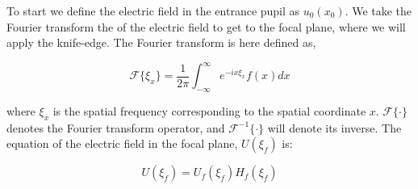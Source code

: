  




To start we define the electric field in the entrance pupil as $u_0(x_0)$. We take the Fourier transform the of the electric field to get to the focal plane, where we will apply the knife-edge. The Fourier transform is here defined as,

\begin{equation}
    \mathcal{F}\{\xi_x\}=\frac{1}{2\pi}\int_{-\infty}^\infty e^{-i x \xi_x} f(x) dx
    \label{FourierT}
\end{equation}

\noindent where $\xi_x$ is the spatial frequency corresponding to the spatial coordinate $x$. $\mathcal{F}\{\cdot\}$ denotes the Fourier transform operator, and  $\mathcal{F}^{-1}\{\cdot\}$ will denote its inverse. The equation of the electric field in the focal plane, $U(\xi_f)$ is:

\begin{equation}
    U (\xi_f)=U_f(\xi_f)H_f(\xi_f)
    \label{FT}
\end{equation}

